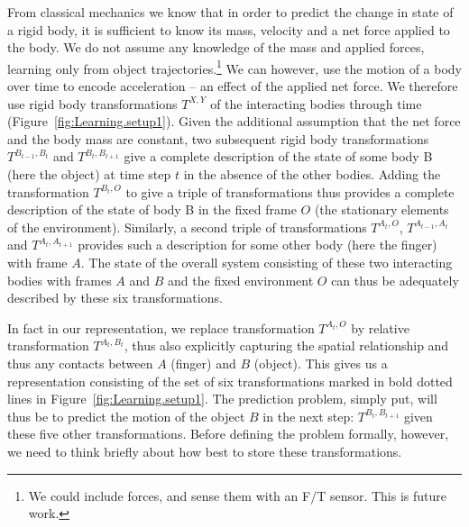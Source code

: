 From classical mechanics we know that in order to predict the change
in state of a rigid body, it is sufficient to know its mass, velocity
and a net force applied to the body.  We do not assume any knowledge of
the mass and applied forces, learning only from object trajectories.\footnote{We could include forces, and sense them with an F/T sensor. This is future work.} We can however, use the motion of a body over time to encode acceleration -- an effect of the applied net
force. We therefore use rigid body transformations $T^{X,Y}$ of the interacting bodies through time (Figure~\ref{fig:Learning.setup1}). Given the additional assumption that the net force and the body mass are constant, two subsequent rigid body transformations $T^{B_{t-1},
  B_{t}}$ and $T^{B_{t},B_{t+1}}$ give a complete description of the
state of some body B (here the object) at time step $t$ in the absence
of the other bodies.  Adding the transformation $T^{B_t, O}$ to give a
triple of transformations thus provides a complete description of the
state of body B in the fixed frame $O$ (the stationary elements of the
environment).  Similarly, a second triple of transformations $T^{A_t,
  O}$, $T^{A_{t-1}, A_{t}}$ and $T^{A_{t}, A_{t+1}}$ provides such a
description for some other body (here the finger) with frame $A$. 
The state of the overall system consisting of these two interacting
bodies with frames $A$ and $B$ and the fixed environment $O$ can
thus be adequately described by these six transformations.

In fact in our representation, we replace transformation $T^{A_t, O}$ by relative transformation $T^{A_t, B_t}$, thus also explicitly capturing the spatial relationship and thus any contacts between $A$ (finger) and $B$ (object). This gives us a representation consisting of the set of six transformations marked in bold dotted lines in Figure~\ref{fig:Learning.setup1}. The prediction problem, simply put, will thus be to predict the motion of the object $B$ in the next step: $T^{B_t,B_{t+1}}$ given these five other transformations. Before defining the problem formally, however, we need to think briefly about how best to store these transformations.

